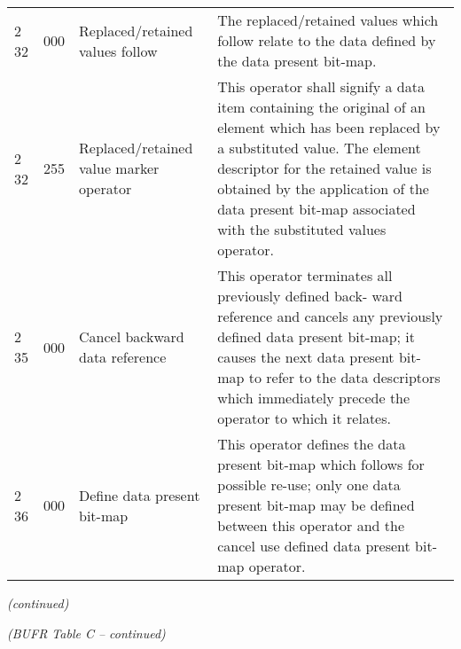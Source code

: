 \begin{longtable}[]{@{}llll@{}}
2 32 & 000 & Replaced/retained values follow & The replaced/retained values which follow relate to the data defined by the data present bit-map.\tabularnewline
2 32 & 255 & Replaced/retained value marker operator & This operator shall signify a data item containing the original of an element which has been replaced by a substituted value. The element descriptor for the retained value is obtained by the application of the data present bit-map associated with the substituted values operator.\tabularnewline
2 35 & 000 & Cancel backward data reference & This operator terminates all previously defined back- ward reference and cancels any previously defined data present bit-map; it causes the next data present bit-map to refer to the data descriptors which immediately precede the operator to which it relates.\tabularnewline
2 36 & 000 & Define data present bit-map & This operator defines the data present bit-map which follows for possible re-use; only one data present bit-map may be defined between this operator and the cancel use defined data present bit-map operator.\tabularnewline
\bottomrule
\end{longtable}

\emph{(continued)}

\emph{(BUFR Table C -- continued)}

